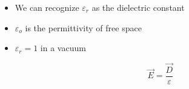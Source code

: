 \begin{itemize}
\begin{itemize}
        \begin{itemize}

          \item We can recognize $\varepsilon_r$ as the dielectric constant

          \item $\varepsilon_o$ is the permittivity of free space

          \item $\varepsilon_r=1$ in a vacuum

            $$\vec{E}=\frac{\vec{D}}{\varepsilon}$$

        \end{itemize}

    \end{itemize}

\end{itemize}



